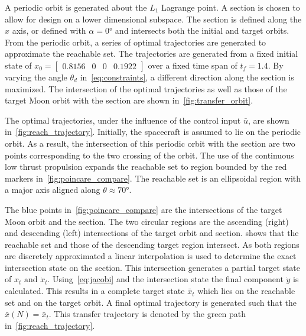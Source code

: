 \documentclass[preprint]{elsarticle}
\begin{document}
A periodic orbit is generated about the \( L_1 \) Lagrange point. 
A \Poincare section is chosen to allow for design on a lower dimensional subspace.
The section is defined along the \( \hat{x} \) axis, or defined with \( \alpha = \ang{0} \) and intersects both the initial and target orbits.
From the periodic orbit, a series of optimal trajectories are generated to approximate the reachable set.
The trajectories are generated from a fixed initial state of \( x_0 = \begin{bmatrix}0.8156 & 0 & 0 & 0.1922 \end{bmatrix} \) over a fixed time span of \( t_f = 1.4 \).
By varying the angle \( \theta_d\) in~\cref{eq:constraints}, a different direction along the \Poincare section is maximized. 
The intersection of the optimal trajectories as well as those of the target Moon orbit with the \Poincare section are shown in~\cref{fig:transfer_orbit}.



The optimal trajectories, under the influence of the control input \( \bar{u} \), are shown in~\cref{fig:reach_trajectory}.
Initially, the spacecraft is assumed to lie on the periodic orbit.
As a result, the intersection of this periodic orbit with the \Poincare section are two points corresponding to the two crossing of the orbit.
The use of the continuous low thrust propulsion expands the reachable set to region bounded by the red markers in~\cref{fig:poincare_compare}.
The reachable set is an ellipsoidal region with a major axis aligned along \( \theta \approx \ang{70} \).



The blue points in~\cref{fig:poincare_compare} are the intersections of the target Moon orbit and the \Poincare section.
The two circular regions are the ascending (right) and descending (left) intersections of the target orbit and \Poincare section.
 shows that the reachable set and those of the descending target region intersect.
As both regions are discretely approximated a linear interpolation is used to determine the exact intersection state on the \Poincare section.
This intersection generates a partial target state of \( x_t \text{ and } \dot{x}_t \).
Using~\cref{eq:jacobi} and the intersection state the final component \( \dot{y} \) is calculated. 
This results in a complete target state \( \bar{x}_t \) which lies on the reachable set and on the target orbit. 
A final optimal trajectory is generated such that the \( \bar{x}(N) = \bar{x}_t \).
This transfer trajectory is denoted by the green path in~\cref{fig:reach_trajectory}.
\end{document}
